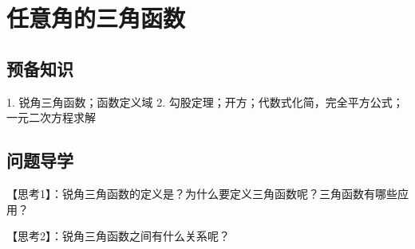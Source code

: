 \section{任意角的三角函数}
\subsection{预备知识}
1. 锐角三角函数；函数定义域
2. 勾股定理；开方；代数式化简，完全平方公式；一元二次方程求解
\subsection{问题导学}
{\heiti 【思考1】}：锐角三角函数的定义是？为什么要定义三角函数呢？三角函数有哪些应用？\par
\vspace{12em}
{\heiti 【思考2】}：锐角三角函数之间有什么关系呢？\par
\vspace{12em}



\stoptexercise
